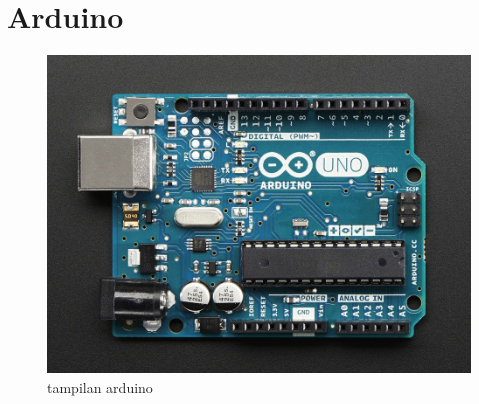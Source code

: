

\section{Arduino}
	\begin{figure}[ht]
	\centerline{\includegraphics[width=1\textwidth]{figures/arduino.JPG}}
	\caption{tampilan arduino}
	\label{arduino}
	\end{figure}
